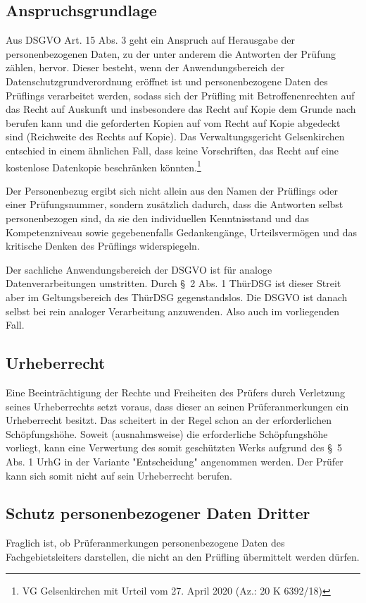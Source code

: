 \documentclass[12pt, a4paper]{article}
\begin{document}
\subsection{Anspruchsgrundlage}
Aus DSGVO Art. 15 Abs. 3 geht ein Anspruch auf Herausgabe der personenbezogenen Daten, zu der unter anderem die Antworten der Prüfung zählen, hervor. Dieser besteht, wenn der Anwendungsbereich der Datenschutzgrundverordnung eröffnet ist und personenbezogene Daten des Prüflings verarbeitet werden, sodass sich der Prüfling mit Betroffenenrechten auf das Recht auf Auskunft und insbesondere das Recht auf Kopie dem Grunde nach berufen kann und die geforderten Kopien auf vom Recht auf Kopie abgedeckt sind (Reichweite des Rechts auf Kopie).
Das Verwaltungsgericht Gelsenkirchen entschied in einem ähnlichen Fall, dass keine Vorschriften, das Recht auf eine kostenlose Datenkopie beschränken könnten.\footnote{VG Gelsenkirchen mit Urteil vom 27. April 2020 (Az.: 20 K 6392/18)} 

Der Personenbezug ergibt sich nicht allein aus den Namen der Prüflings oder einer Prüfungsnummer, sondern zusätzlich dadurch, dass die Antworten selbst personenbezogen sind, da sie den individuellen Kenntnisstand und das Kompetenzniveau sowie gegebenenfalls Gedankengänge, Urteilsvermögen und das kritische Denken des Prüflings widerspiegeln. 

Der sachliche Anwendungsbereich der DSGVO ist für analoge Datenverarbeitungen umstritten. Durch § 2 Abs. 1 ThürDSG ist dieser Streit aber im Geltungsbereich des ThürDSG gegenstandslos. Die DSGVO ist danach selbst bei rein analoger Verarbeitung anzuwenden. Also auch im vorliegenden Fall.

\subsection{Urheberrecht}
Eine Beeinträchtigung der Rechte und Freiheiten des Prüfers durch Verletzung seines Urheberrechts setzt voraus, dass dieser an seinen Prüferanmerkungen ein Urheberrecht besitzt. Das scheitert in der Regel schon an der erforderlichen Schöpfungshöhe. Soweit (ausnahmsweise) die erforderliche Schöpfungshöhe vorliegt, kann eine Verwertung des somit geschützten Werks aufgrund des § 5 Abs. 1 UrhG in der Variante "Entscheidung" angenommen werden. Der Prüfer kann sich somit nicht auf sein Urheberrecht berufen.

\subsection{Schutz personenbezogener Daten Dritter}
Fraglich ist, ob Prüferanmerkungen personenbezogene Daten des Fachgebietsleiters darstellen, die nicht an den Prüfling übermittelt werden dürfen.
\end{document}
